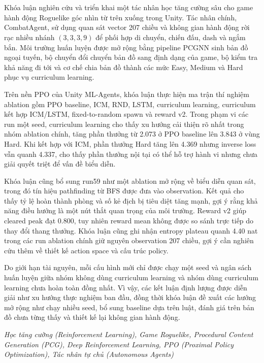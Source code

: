 \clearpage
{}

\chapter*{\fontsize{13}{13}\selectfont{Tóm tắt}}

Khóa luận nghiên cứu và triển khai một tác nhân học tăng cường sâu cho game hành động Roguelike góc nhìn từ trên xuống trong Unity. Tác nhân chính, CombatAgent, sử dụng quan sát vector 207 chiều và không gian hành động rời rạc nhiều nhánh $(3,3,3,9)$ để phối hợp di chuyển, chiến đấu, dash và ngắm bắn. Môi trường huấn luyện được mở rộng bằng pipeline PCGNN sinh bản đồ ngoại tuyến, bộ chuyển đổi chuyển bản đồ sang định dạng của game, bộ kiểm tra khả năng đi tới và cơ chế chia bản đồ thành các mức Easy, Medium và Hard phục vụ curriculum learning.

Trên nền PPO của Unity ML-Agents, khóa luận thực hiện ma trận thí nghiệm ablation gồm PPO baseline, ICM, RND, LSTM, curriculum learning, curriculum kết hợp ICM/LSTM, fixed-to-random spawn và reward v2. Trong phạm vi các run một seed, curriculum learning cho thấy xu hướng cải thiện rõ nhất trong nhóm ablation chính, tăng phần thưởng từ 2.073 ở PPO baseline lên 3.843 ở vùng Hard. Khi kết hợp với ICM, phần thưởng Hard tăng lên 4.369 nhưng inverse loss vẫn quanh 4.337, cho thấy phần thưởng nội tại có thể hỗ trợ hành vi nhưng chưa giải quyết triệt để vấn đề biểu diễn.

Khóa luận cũng bổ sung run59 như một ablation mở rộng về biểu diễn quan sát, trong đó tín hiệu pathfinding từ BFS được đưa vào observation. Kết quả cho thấy tỷ lệ hoàn thành phòng và số kẻ địch bị tiêu diệt tăng mạnh, gợi ý rằng khả năng điều hướng là một nút thắt quan trọng của môi trường. Reward v2 giúp cleared peak đạt 0.800, tuy nhiên reward mean không được so sánh trực tiếp do thay đổi thang thưởng. Khóa luận cũng ghi nhận entropy plateau quanh 4.40 nat trong các run ablation chính giữ nguyên observation 207 chiều, gợi ý cần nghiên cứu thêm về thiết kế action space và cấu trúc policy.

Do giới hạn tài nguyên, mỗi cấu hình mới chỉ được chạy một seed và ngân sách huấn luyện giữa nhóm không dùng curriculum learning và nhóm dùng curriculum learning chưa hoàn toàn đồng nhất. Vì vậy, các kết luận định lượng được diễn giải như xu hướng thực nghiệm ban đầu, đồng thời khóa luận đề xuất các hướng mở rộng như chạy nhiều seed, bổ sung baseline dựa trên luật, đánh giá trên bản đồ chưa từng thấy và thiết kế lại không gian hành động.

\vspace{0.5cm}
 \textit{Học tăng cường (Reinforcement Learning), Game Roguelike, Procedural Content Generation (PCG), Deep Reinforcement Learning, PPO (Proximal Policy Optimization), Tác nhân tự chủ (Autonomous Agents)}
